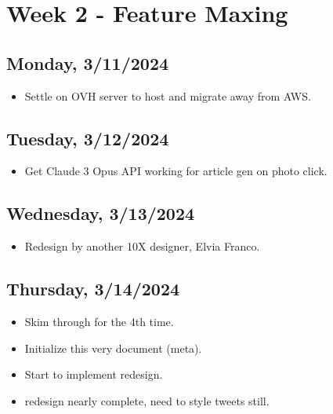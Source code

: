 \newpage
\section{Week 2 - Feature Maxing}

\subsection*{Monday, 3/11/2024}
\begin{itemize}
    \item Settle on OVH server to host and migrate away from AWS.
\end{itemize}

\subsection*{Tuesday, 3/12/2024}
\begin{itemize}
    \item Get Claude 3 Opus API working for article gen on photo click.
\end{itemize}

\subsection*{Wednesday, 3/13/2024}
\begin{itemize}
    \item Redesign by another 10X designer, Elvia Franco. 
\end{itemize}

\subsection*{Thursday, 3/14/2024}
\begin{itemize}
    \item Skim through \cite{huyen2022designing} for the 4th time.
    \item Initialize this very document (meta).
    \item Start to implement redesign.
    \item redesign nearly complete, need to style tweets still.
\end{itemize}


